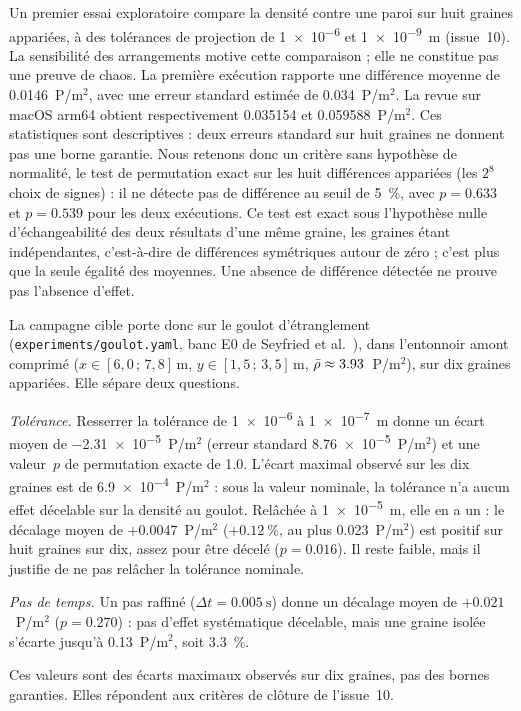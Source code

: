 Un premier essai exploratoire compare la densité contre une paroi sur huit graines
appariées, à des tolérances de projection de \num{1e-6} et \SI{1e-9}{\metre}
(issue~10). La sensibilité des arrangements motive cette comparaison ; elle ne
constitue pas une preuve de chaos. La première exécution rapporte une différence
moyenne de \num{0.0146}~P/m$^2$, avec une erreur standard estimée de
\num{0.034}~P/m$^2$. La revue sur macOS arm64 obtient respectivement
\num{0.035154} et \num{0.059588}~P/m$^2$. Ces statistiques sont descriptives : deux
erreurs standard sur huit graines ne donnent pas une borne garantie. Nous retenons donc
un critère sans hypothèse de normalité, le test de permutation exact sur les huit
différences appariées (les $2^8$ choix de signes) : il ne détecte pas de différence au
seuil de \SI{5}{\percent}, avec $p=\num{0.633}$ et $p=\num{0.539}$ pour les deux
exécutions. Ce test est exact sous l'hypothèse nulle d'échangeabilité des deux
résultats d'une même graine, les graines étant indépendantes, c'est-à-dire de
différences symétriques autour de zéro ; c'est plus que la seule égalité des moyennes.
Une absence de différence détectée ne prouve pas l'absence d'effet.

La campagne cible porte donc sur le goulot d'étranglement (\texttt{experiments/goulot.yaml},
banc E0 de Seyfried et al.~\cite{seyfried2009}), dans l'entonnoir amont comprimé
($x\in[6{,}0\,;\,7{,}8]\,\si{\metre}$, $y\in[1{,}5\,;\,3{,}5]\,\si{\metre}$,
$\bar{\rho}\approx\num{3.93}$~P/m$^2$), sur dix graines appariées. Elle sépare deux
questions.

\emph{Tolérance.} Resserrer la tolérance de \num{1e-6} à \SI{1e-7}{\metre} donne un écart
moyen de \num{-2.31e-5}~P/m$^2$ (erreur standard \num{8.76e-5}~P/m$^2$) et une valeur~$p$ de
permutation exacte de \num{1.0}. L'écart maximal observé sur les dix graines est de
\num{6.9e-4}~P/m$^2$ : sous la valeur nominale, la tolérance n'a aucun effet décelable sur
la densité au goulot. Relâchée à \SI{1e-5}{\metre}, elle en a un : le décalage moyen de
$+\num{0.0047}$~P/m$^2$ ($+\SI{0.12}{\percent}$, au plus \num{0.023}~P/m$^2$) est
positif sur huit graines sur dix, assez pour être décelé ($p=\num{0.016}$). Il reste
faible, mais il justifie de ne pas relâcher la tolérance nominale.

\emph{Pas de temps.} Un pas raffiné ($\Delta t=\SI{0.005}{\second}$) donne un décalage moyen
de $+\num{0.021}$~P/m$^2$ ($p=\num{0.270}$) : pas d'effet systématique décelable, mais une
graine isolée s'écarte jusqu'à \num{0.13}~P/m$^2$, soit \SI{3.3}{\percent}.

Ces valeurs sont des écarts maximaux observés sur dix graines, pas des bornes garanties.
Elles répondent aux critères de clôture de l'issue~10.
